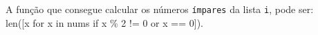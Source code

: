 \documentclass[12pt,varwidth=16cm,border=1pt]{standalone}
\begin{document}
A função que consegue calcular os números \verb+ímpares+ da lista \verb+i+, pode ser: \\ len([x for x in nums if x \% 2 != 0 or x == 0]).

\questiomfalse
\end{document}
